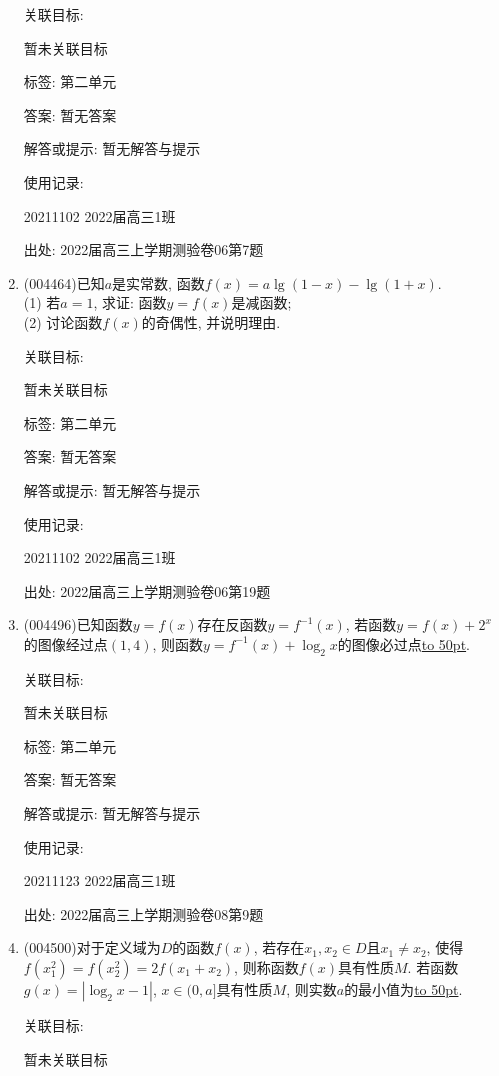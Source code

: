 \documentclass[10pt,a4paper]{article}
\newcommand{\blank}[1]{\underline{\hbox to #1pt{}}}
\begin{document}
\begin{enumerate}[1.]
关联目标:

暂未关联目标



标签: 第二单元

答案: 暂无答案

解答或提示: 暂无解答与提示

使用记录:

20211102	2022届高三1班	


出处: 2022届高三上学期测验卷06第7题
\item { (004464)}已知$a$是实常数, 函数$f(x)=a\lg(1-x)-\lg (1+x)$.\\
(1) 若$a=1$, 求证: 函数$y=f(x)$是减函数;\\
(2) 讨论函数$f(x)$的奇偶性, 并说明理由.


关联目标:

暂未关联目标



标签: 第二单元

答案: 暂无答案

解答或提示: 暂无解答与提示

使用记录:

20211102	2022届高三1班		


出处: 2022届高三上学期测验卷06第19题
\item { (004496)}已知函数$y=f(x)$存在反函数$y=f^{-1}(x)$, 若函数$y=f(x)+2^x$的图像经过点$(1,4)$, 则函数$y=f^{-1}(x)+\log_2x$的图像必过点\blank{50}.


关联目标:

暂未关联目标



标签: 第二单元

答案: 暂无答案

解答或提示: 暂无解答与提示

使用记录:

20211123	2022届高三1班	


出处: 2022届高三上学期测验卷08第9题
\item { (004500)}对于定义域为$D$的函数$f(x)$, 若存在$x_1,x_2\in D$且$x_1\ne x_2$, 使得$f(x_1^2)=f(x_2^2)=2f(x_1+x_2)$, 则称函数$f(x)$具有性质$M$. 若函数$g(x)=|\log_2x-1|$, $x\in (0,a]$具有性质$M$, 则实数$a$的最小值为\blank{50}.


关联目标:

暂未关联目标




\end{enumerate}
\end{document}
